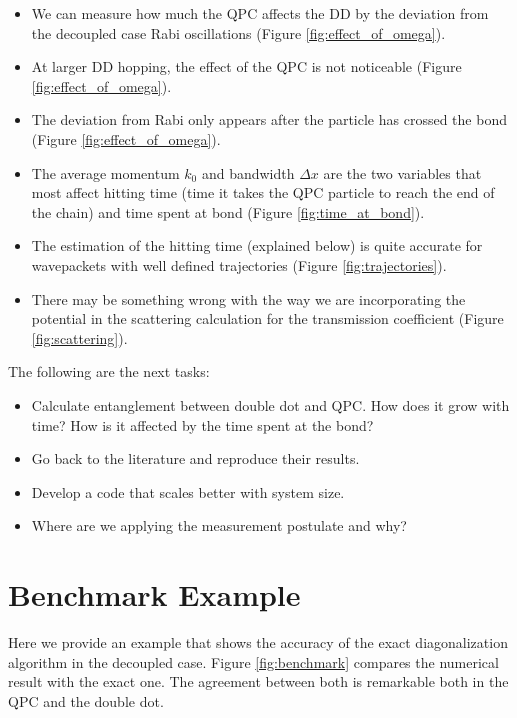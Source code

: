\documentclass{article}
\begin{document}
\begin{itemize}
    \item We can measure how much the QPC affects the DD by the deviation from the decoupled case Rabi oscillations (Figure \ref{fig:effect_of_omega}). 
    \item  At larger DD hopping, the effect of the QPC is not noticeable (Figure \ref{fig:effect_of_omega}). 
    \item  The deviation from Rabi only appears after the particle has crossed the bond (Figure \ref{fig:effect_of_omega}).
    \item  The average momentum $k_{0}$ and bandwidth $\Delta x$ are the two variables that most affect hitting time (time it takes the QPC particle to reach the end of the chain) and time spent at bond (Figure \ref{fig:time_at_bond}).  
    \item  The estimation of the hitting time (explained below) is quite accurate for wavepackets with well defined trajectories (Figure \ref{fig:trajectories}).
    \item  There may be something wrong with the way we are incorporating the potential in the scattering calculation for the transmission coefficient (Figure \ref{fig:scattering}).
\end{itemize}

The following are the next tasks:
\begin{itemize}
    \item Calculate entanglement between double dot and QPC. How does it grow with time? How is it affected by the time spent at the bond?
    \item Go back to the literature and reproduce their results. 
    \item Develop a code that scales better with system size.
    \item Where are we applying the measurement postulate and why?
\end{itemize}


\section{Benchmark Example}\label{sec:benchmark}

Here we provide an example that shows the accuracy of the exact diagonalization algorithm in the decoupled case. Figure \ref{fig:benchmark} compares the numerical result with the exact one. The agreement between both is remarkable both in the QPC and the double dot. 
\end{document}

